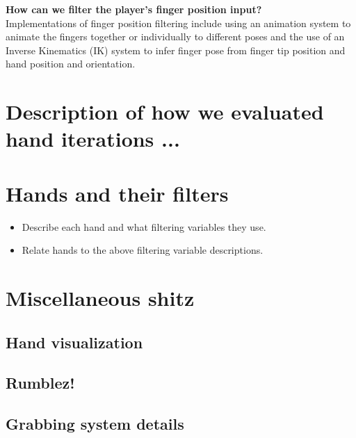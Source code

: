 \textbf{How can we filter the player's finger position input?}\\
Implementations of finger position filtering include using an animation system to animate the fingers together or individually to different poses and the use of an Inverse Kinematics (IK) system to infer finger pose from finger tip position and hand position and orientation.


\section{Description of how we evaluated hand iterations ...}
\label{sec:DESCRIPTIONOFEVALUATIONSCENARIOS}

\section{Hands and their filters}
\label{sec:LABELABOUTHANDSVERSIONS}
\begin{itemize}
\item Describe each hand and what filtering variables they use.
\item Relate hands to the above filtering variable descriptions.
\end{itemize}


\section{Miscellaneous shitz}
\label{sec:MISCELLANEOUSSHITZ}

\subsection{Hand visualization}
\label{subsec:handVisualization}

\subsection{Rumblez!}
\label{subsec:RUMLBEZ}

\subsection{Grabbing system details}
\label{subsec:grabbingSystem}